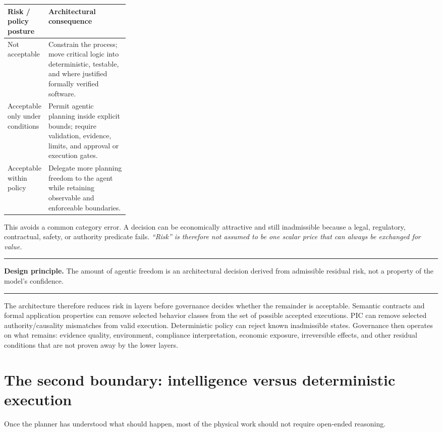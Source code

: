 \documentclass[10pt,oneside,openany]{book}
\newcommand{\principle}[1]{%
  \vspace{4pt}
  \noindent\begin{minipage}{\linewidth}
  \hrule\vspace{5pt}
  \small\sffamily\raggedright\textbf{Design principle.} #1
  \vspace{5pt}\hrule
  \end{minipage}\vspace{4pt}
}
\begin{document}
\begin{center}
\begin{tabularx}{0.94\linewidth}{>{\raggedright\arraybackslash}p{0.28\linewidth} Y}
\toprule
\textbf{Risk / policy posture} & \textbf{Architectural consequence} \\
\midrule
Not acceptable & Constrain the process; move critical logic into deterministic, testable, and where justified formally verified software. \\
Acceptable only under conditions & Permit agentic planning inside explicit bounds; require validation, evidence, limits, and approval or execution gates. \\
Acceptable within policy & Delegate more planning freedom to the agent while retaining observable and enforceable boundaries. \\
\bottomrule
\end{tabularx}
\end{center}

This avoids a common category error. A decision can be economically attractive and still inadmissible because a legal, regulatory, contractual, safety, or authority predicate fails. \emph{``Risk'' is therefore not assumed to be one scalar price that can always be exchanged for value.}

\principle{The amount of agentic freedom is an architectural decision derived from admissible residual risk, not a property of the model's confidence.}

The architecture therefore reduces risk in layers before governance decides whether the remainder is acceptable. Semantic contracts and formal application properties can remove selected behavior classes from the set of possible accepted executions. PIC can remove selected authority/causality mismatches from valid execution. Deterministic policy can reject known inadmissible states. Governance then operates on what remains: evidence quality, environment, compliance interpretation, economic exposure, irreversible effects, and other residual conditions that are not proven away by the lower layers.

\section{The second boundary: intelligence versus deterministic execution}

Once the planner has understood what should happen, most of the physical work should not require open-ended reasoning.
\end{document}

